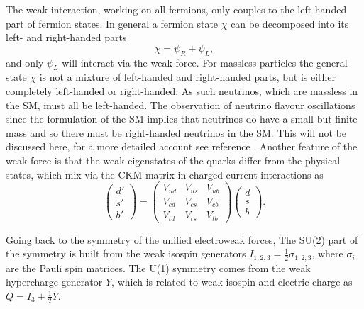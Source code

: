 The weak interaction, working on all fermions,
only couples to the left-handed part of fermion states. In 
general a fermion state $\chi$ can be decomposed into its left- and right-handed parts
\begin{equation}\label{eqn:leftright}
\chi=\psi_R+\psi_L,
\end{equation}
and only $\psi_L$ will interact via the weak force. For massless particles
the general state $\chi$ is not a mixture of left-handed and right-handed parts,
but is either completely left-handed or right-handed. As such neutrinos, which are
massless in the \ac{SM}, must all be left-handed. %
The observation of neutrino flavour oscillations since the formulation of
the \ac{SM} implies that neutrinos do have a small but finite mass
and so there must be right-handed neutrinos in the \ac{SM}. This will
not be discussed here, for a more detailed account see reference \cite{pdg-2014}.
Another feature of the weak force is that the weak eigenstates of the quarks
differ from the physical states, which mix via the \ac{CKM}-matrix \cite{ckm-matrix-cabibbo,ckm-matrix-KM}
in charged current interactions as
\begin{equation}\label{eqn:ckm_matrix}
\begin{pmatrix} d' \\
s' \\
b'  \end{pmatrix} = \begin{pmatrix} V_{ud} & V_{us} & V_{ub} \\
V_{cd} & V_{cs} & V_{cb} \\
V_{td} & V_{ts} & V_{tb} \end{pmatrix} \begin{pmatrix} d \\
s\\
b \end{pmatrix}.
\end{equation}

Going back to the symmetry of the unified electroweak forces,
The SU(2) part of the symmetry is built from the weak
isospin generators $I_{1,2,3} = \frac{1}{2}\sigma_{1,2,3}$,
where $\sigma_i$ are the Pauli spin matrices. The U(1)
symmetry comes from the weak hypercharge generator $Y$, which
is related to weak isospin and electric charge as $Q = I_3 + \frac{1}{2}Y$.

